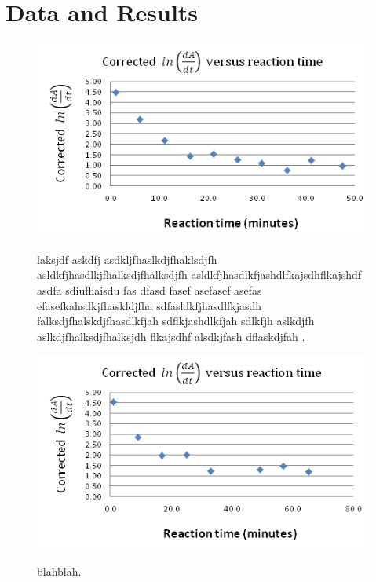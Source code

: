 \section{Data and Results}

\begin{figure}[h]
  \includegraphics[scale=0.5]{./Figures/20M_dipic_readings.png}\\
  \caption{laksjdf askdfj asdkljfhaslkdjfhaklsdjfh asldkfjhasdlkjfhalksdjfhalksdjfh asldkfjhasdlkfjashdlfkajsdhflkajshdf asdfa sdiufhaisdu fas dfasd fasef asefasef asefas efasefkahsdkjfhaskldjfha sdfasldkfjhasdlfkjasdh falksdjfhalskdjfhasdlkfjah sdflkjashdlkfjah sdlkfjh aslkdjfh aslkdjfhalksdjfhalksjdh flkajsdhf alsdkjfash dflaskdjfah .}\label{fig:0.20M_dipic_readings}
\end{figure}

\begin{figure}[h]
  \includegraphics[scale=0.5]{./Figures/10M_dipic_readings.png}\\
  \caption{blahblah.}\label{fig:0.10M_dipic_readings}
\end{figure}

